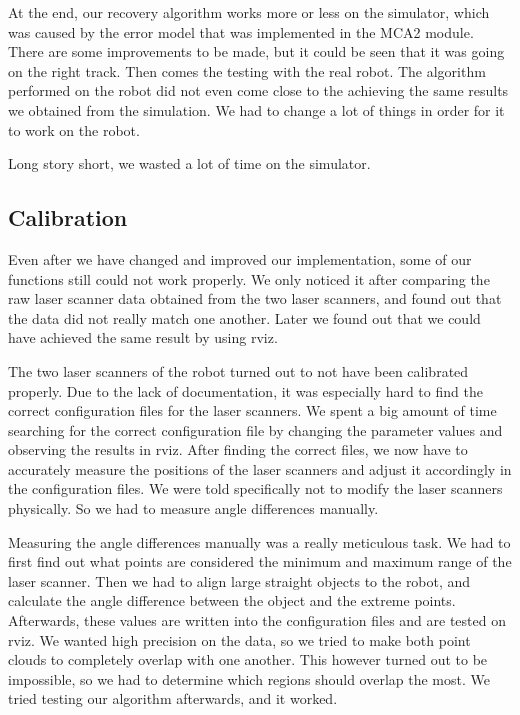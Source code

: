 At the end, our recovery algorithm works more or less on the simulator, which was caused by the error model that was implemented in the MCA2 module. There are some improvements to be made, but it could be seen that it was going on the right track. Then comes the testing with the real robot. The algorithm performed on the robot did not even come close to the achieving the same results we obtained from the simulation. We had to change a lot of things in order for it to work on the robot.

Long story short, we wasted a lot of time on the simulator.


\subsection{Calibration}

Even after we have changed and improved our implementation, some of our functions still could not work properly. We only noticed it after comparing the raw laser scanner data obtained from the two laser scanners, and found out that the data did not really match one another. Later we found out that we could have achieved the same result by using rviz.

The two laser scanners of the robot turned out to not have been calibrated properly. Due to the lack of documentation, it was especially hard to find the correct configuration files for the laser scanners. We spent a big amount of time searching for the correct configuration file by changing the parameter values and observing the results in rviz. After finding the correct files, we now have to accurately measure the positions of the laser scanners and adjust it accordingly in the configuration files. We were told specifically not to modify the laser scanners physically. So we had to measure angle differences manually.

Measuring the angle differences manually was a really meticulous task. We had to first find out what points are considered the minimum and maximum range of the laser scanner. Then we had to align large straight objects to the robot, and calculate the angle difference between the object and the extreme points. Afterwards, these values are written into the configuration files and are tested on rviz. We wanted high precision on the data, so we tried to make both point clouds to completely overlap with one another. This however turned out to be impossible, so we had to determine which regions should overlap the most. We tried testing our algorithm afterwards, and it worked.

